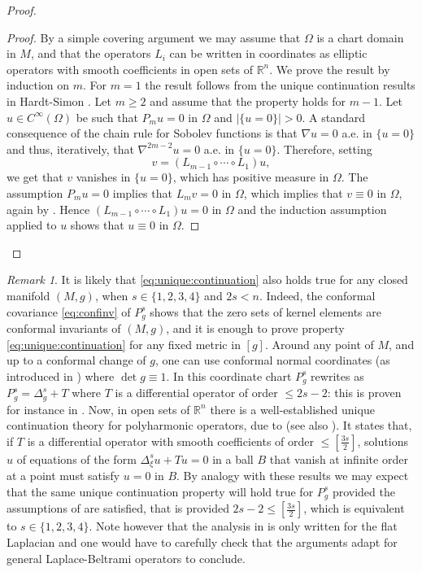 \documentclass[10pt]{amsart}
\numberwithin{equation}{section}
\newcommand{\R}{\mathbb{R}}
\def\Om{{\Omega}}
\theoremstyle{plain}
\theoremstyle{remark}
\newtheorem{rem}{Remark}[section]
\begin{document}
\begin{proof}
\begin{proof}
By a simple covering argument we may assume that $\Om$ is a chart domain in $M$, and that the operators $L_i$ can be written in coordinates as elliptic operators with smooth coefficients in open sets of $\R^n$. We prove the result by induction on $m$. For $m=1$ the result follows from the unique continuation results in Hardt-Simon \cite[Theorem 1.10]{HardtSimon}. Let $m \ge 2$ and assume that the property holds for $m-1$. Let $u \in C^\infty(\Omega)$ be such that $P_m u = 0$ in $\Omega$ and $|\{u = 0\}| >0$. %
A standard consequence of the chain rule for Sobolev functions is that $\nabla u = 0$ a.e. in $\{u=0\}$ and thus, iteratively, that $\nabla^{2m-2}u = 0$ a.e. in $\{u=0\}$. %
Therefore, setting
$$ v = (L_{m-1} \circ \cdots \circ L_1)u ,$$
we get that $v$ vanishes in $\{u=0\}$, which has positive measure in $\Omega$. The assumption $P_mu = 0$ implies that $ L_m v = 0$ in $\Omega$, which implies that $v\equiv0$ in $\Omega$, again by \cite[Theorem 1.10]{HardtSimon}. Hence $ (L_{m-1} \circ \cdots \circ L_1)u = 0 $ in $\Omega$ and the induction assumption applied to $u$ shows that $u\equiv 0$ in $\Omega$.
\end{proof}
\end{proof}

    
\begin{rem}    
It is likely that \eqref{eq:unique:continuation} also holds true for any closed manifold $(M,g)$, when $s \in \{1,2,3,4\}$ and $2s < n$. Indeed, the conformal covariance \eqref{eq:confinv} of $P_g^s$ shows that the zero sets of kernel elements are conformal invariants of $(M,g)$, and it is enough to prove property \eqref{eq:unique:continuation} for any fixed metric in $[g]$. Around any point of $M$, and up to a conformal change of $g$, one can use conformal normal coordinates (as introduced in \cite{LeeParker}) where $\det g \equiv 1$. In this coordinate chart $P_g^s$ rewrites as $P_g^s = \Delta_g^s + T$ where $T$ is a differential operator of order $\leq 2s-2$: this is proven for instance in \cite[Equation (2.7)]{MazumdarVetois}. Now, in open sets of $\R^n$ there is a well-established unique continuation theory for polyharmonic operators, due to \cite{Protter} (see also \cite{LinUC}). It states that, if $T$ is a differential operator with smooth coefficients of order $\le  [\frac{3s}{2}]$, solutions $u$ of equations of the form $\Delta_\xi^s u + T u = 0$ in a ball $B$ that vanish at infinite order at a point must satisfy $u=0$ in $B$. By analogy with these results we may expect that the same unique continuation property will hold true for $P_g^s$ provided the assumptions of \cite{LinUC, Protter} are satisfied, that is provided $2s-2 \le [\frac{3s}{2}]$, which is equivalent to $s \in \{1,2,3,4\}$. Note however that the analysis in \cite{LinUC, Protter} is only written for the flat Laplacian and one would have to carefully check that the arguments adapt for general Laplace-Beltrami operators to conclude.
    \end{rem}
\end{document}
